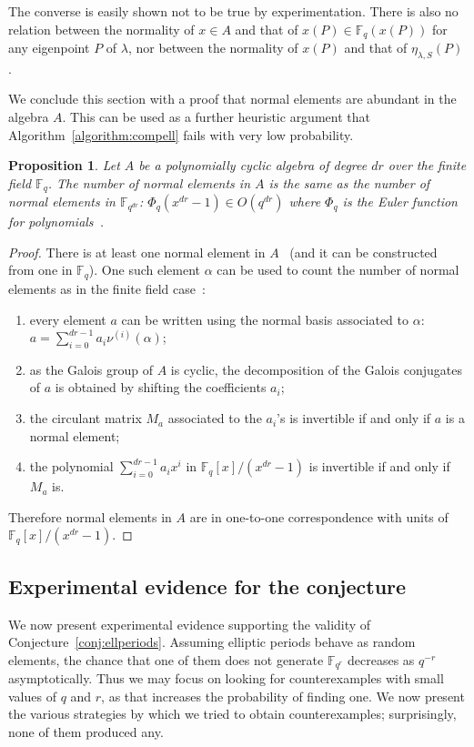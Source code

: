 \documentclass[12pt]{article}
\theoremstyle{plain}
\newtheorem{proposition}[theorem]{Proposition}
\theoremstyle{definition}
\def\F{\ensuremath{\mathbb{F}}}
\newcounter{algorithm}
\begin{document}
The converse is easily shown not to be true by experimentation.
There is also no relation between the normality of $x \in A$
and that of $x(P) \in \F_q(x(P))$ for any eigenpoint $P$ of $\lambda$,
nor between the normality of $x(P)$ and that of $\eta_{\lambda,S}(P)$.

We conclude this section with a proof that normal elements are
abundant in the algebra $A$. %
This can be used as a further heuristic argument that
Algorithm~\ref{algorithm:compell} fails with very low probability.

\begin{proposition}
\label{prop:euleralgebra}
Let $A$ be a polynomially cyclic algebra of degree $dr$
over the finite field $\F_q$.
The number of normal elements in $A$ is the same as the
number of normal elements in $\F_{q^{dr}}$:
$\Phi_q(x^{dr}-1) \in O(q^{dr})$ where $\Phi_q$ is the Euler function
for polynomials~\cite[Lemma~3.69]{lidl+niederreiter:2}.
\end{proposition}
\begin{proof}
There is at least one normal element in $A$~\cite[Theorem 4]{Mihailescu2010825}
(and it can be constructed from one in $\F_q$).
One such element $\alpha$ can be used to count the number of normal elements
as in the finite field case~\cite[Theorem~3.73]{lidl+niederreiter:2}:
\begin{enumerate}
\item every element $a$ can be written using the normal basis
associated to $\alpha$: $a = \sum_{i=0}^{dr-1} a_i \nu^{(i)}(\alpha)$;
\item as the Galois group of $A$ is cyclic, the decomposition
of the Galois conjugates of $a$ is obtained by shifting the coefficients $a_i$;
\item the circulant matrix $M_a$ associated to the $a_i$'s is invertible
if and only if $a$ is a normal element;
\item the polynomial $\sum_{i=0}^{dr-1} a_i x^i$ in $\F_q[x] / (x^{dr}-1)$
is invertible if and only if $M_a$ is.
\end{enumerate}
Therefore normal elements in $A$ are in one-to-one correspondence
with units of $\F_q[x] / (x^{dr}-1)$.
\end{proof}


\subsection{Experimental evidence for the conjecture}

We now present experimental evidence supporting the validity of
Conjecture~\ref{conj:ellperiods}. %
Assuming elliptic periods behave as random elements, the chance that
one of them does not generate $\F_{q^r}$ decreases as $q^{-r}$
asymptotically. %
Thus we may focus on looking for counterexamples with small values of
$q$ and $r$, as that increases the probability of finding one. %
We now present the various strategies by which we tried to obtain
counterexamples; surprisingly, none of them produced any.
\end{document}
